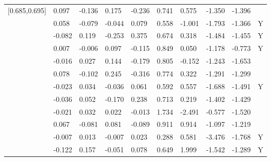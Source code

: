 \begin{table}[ht]
\begin{tabular}{llllllllll}
  [0.685,0.695] &  0.097 & -0.136 &  0.175 & -0.236 &   0.741 &   0.575 &  -1.350 &  -1.396 &  \\ 
  [0.695,0.705] &  0.058 & -0.079 & -0.044 &  0.079 &   0.558 &  -1.001 &  -1.793 &  -1.366 & Y \\ 
  [0.705,0.715] & -0.082 &  0.119 & -0.253 &  0.375 &   0.674 &   0.318 &  -1.484 &  -1.455 & Y \\ 
  [0.715,0.725] &  0.007 & -0.006 &  0.097 & -0.115 &   0.849 &   0.050 &  -1.178 &  -0.773 & Y \\ 
  [0.725,0.735] & -0.016 &  0.027 &  0.144 & -0.179 &   0.805 &  -0.152 &  -1.243 &  -1.653 &  \\ 
  [0.735,0.745] &  0.078 & -0.102 &  0.245 & -0.316 &   0.774 &   0.322 &  -1.291 &  -1.299 &  \\ 
  [0.745,0.755] & -0.023 &  0.034 & -0.036 &  0.061 &   0.592 &   0.557 &  -1.688 &  -1.491 & Y \\ 
  [0.755,0.765] & -0.036 &  0.052 & -0.170 &  0.238 &   0.713 &   0.219 &  -1.402 &  -1.429 &  \\ 
  [0.765,0.775] & -0.021 &  0.032 &  0.022 & -0.013 &   1.734 &  -2.491 &  -0.577 &  -1.520 &  \\ 
  [0.775,0.785] &  0.067 & -0.081 &  0.081 & -0.089 &   0.911 &   0.914 &  -1.097 &  -1.219 &  \\ 
  [0.785,0.795] & -0.007 &  0.013 & -0.007 &  0.023 &   0.288 &   0.581 &  -3.476 &  -1.768 & Y \\ 
  [0.795,0.805] & -0.122 &  0.157 & -0.051 &  0.078 &   0.649 &   1.999 &  -1.542 &  -1.289 & Y \\ 
   \hline
\end{tabular}
\end{table}
